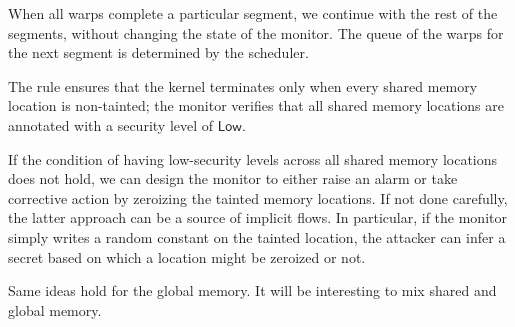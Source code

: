 When all warps complete a particular segment, we continue with the rest of the segments, without changing the state of the monitor.
%
The queue of the warps for the next segment is determined by the scheduler.
\begin{mathpar}
\end{mathpar}

The rule ensures that the kernel terminates only when every shared memory location is non-tainted; the monitor verifies that all shared memory locations are annotated with a security level of $\mathsf{Low}$.

\begin{mathpar}
\end{mathpar}

If the condition of having low-security levels across all shared memory locations does not hold, we can design the monitor to either raise an alarm or take corrective action by zeroizing the tainted memory locations. 
% 
%
If not done carefully, the latter approach can be a source of implicit flows. 
%
In particular, if the monitor simply writes a random constant on the tainted location, the attacker can infer a secret based on which a location might be zeroized or not.



Same ideas hold for the global memory.
It will be interesting to mix shared and global memory.


